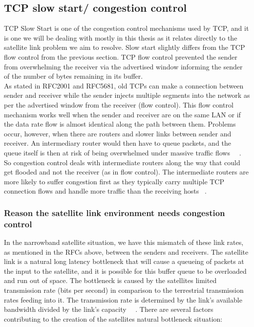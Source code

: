 \subsection{TCP slow start/ congestion control}
TCP Slow Start is one of the congestion control mechanisms used by TCP, and it is one we will be dealing with mostly in this thesis as it relates directly to the satellite link problem we aim to resolve. Slow start slightly differs from the TCP flow control from the previous section. TCP flow control prevented the sender from overwhelming the receiver via the advertised window informing the sender of the number of bytes remaining in its buffer. \\

As stated in RFC2001 and RFC5681, old TCPs can make a connection between sender and receiver while the sender injects multiple segments into the network as per the advertised window from the receiver (flow control). This flow control mechanism works well when the sender and receiver are on the same LAN or if the data rate flow is almost identical along the path between them. Problems occur, however, when there are routers and slower links between sender and receiver. An intermediary router would then have to queue packets, and the queue itself is then at risk of being overwhelmed under massive traffic flows ~\cite{17}~\cite{18}. So congestion control deals with intermediate routers along the way that could get flooded and not the receiver (as in flow control). The intermediate routers are more likely to suffer congestion first as they typically carry multiple TCP connection flows and handle more traffic than the receiving hosts ~\cite{18}.\\

\subsubsection*{Reason the satellite link environment needs congestion control}
In the narrowband satellite situation, we have this mismatch of these link rates, as mentioned in the RFCs above, between the senders and receivers. The satellite link is a natural long latency bottleneck that will cause a queueing of packets at the input to the satellite, and it is possible for this buffer queue to be overloaded and run out of space. The bottleneck is caused by the satellites limited transmission rate (bits per second) in comparison to the terrestrial transmission rates feeding into it. The transmission rate is determined by the link's available bandwidth divided by the link's capacity ~\cite{4}~\cite{8}. There are several factors contributing to the creation of the satellites natural bottleneck situation:\\

